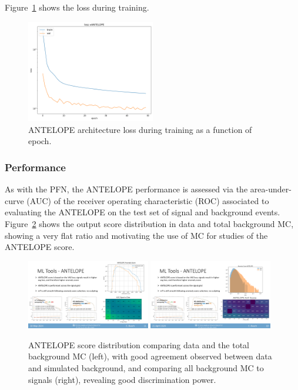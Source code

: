 Figure~\ref{fig:antelope_loss} shows the loss during training.
\begin{figure}[!htbp]
\centering
   \includegraphics[width=0.5\textwidth]{figures/ml/antelope_loss}    
    \caption{ANTELOPE architecture loss during training as a function of epoch.
    \label{fig:antelope_loss}}
\end{figure}


\subsubsection{Performance}
\label{subsec:antelope_perf}

As with the PFN, the ANTELOPE performance is assessed via the area-under-curve (AUC) of the receiver operating characteristic (ROC) associated to evaluating the ANTELOPE on the test set of signal and background events.
Figure~\ref{fig:antelope_score} shows the output score distribution in data and total background MC, showing a very flat ratio and motivating the use of MC for studies of the ANTELOPE score.

\begin{figure}[!htbp]
\centering
   \includegraphics[width=0.48\textwidth]{figures/ml/antelope_score.pdf}
   \includegraphics[width=0.48\textwidth]{figures/ml/antelope_score_mcsig}
    \caption{ANTELOPE score distribution comparing data and the total background MC (left), with good agreement observed between data and simulated background, and comparing all background MC to signals (right), revealing good discrimination power.
    \label{fig:antelope_score}}
\end{figure}

